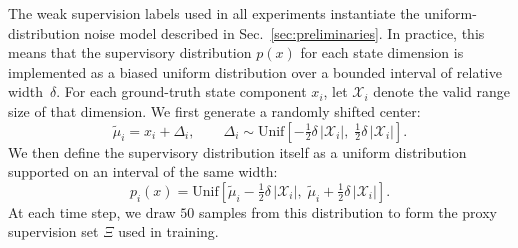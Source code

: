 \documentclass[nonacm,sigconf]{acmart}
\begin{document}
The weak supervision labels used in all experiments instantiate the 
uniform-distribution noise model described in Sec.~\ref{sec:preliminaries}.  
In practice, this means that the supervisory distribution $p(x)$ for
each state dimension is implemented as a biased uniform distribution over a 
bounded interval of relative width~$\delta$.  For each ground-truth 
state component $x_i$, let $\mathcal{X}_i$ denote the valid 
range size of that dimension.  We first generate a randomly shifted 
center:
\[
\tilde{\mu}_i 
= x_i + \Delta_i,
\qquad 
\Delta_i \sim \mathrm{Unif}\!\left[
    -\tfrac{1}{2}\delta \,|\mathcal{X}_i|,\;
    \tfrac{1}{2}\delta \,|\mathcal{X}_i|
\right].
\]
We then define the supervisory distribution itself as a uniform
distribution supported on an interval of the same width:
\[
p_i(x) = \mathrm{Unif}\!\left[
\tilde{\mu}_i - \tfrac{1}{2}\delta\,|\mathcal{X}_i|,\;
\tilde{\mu}_i + \tfrac{1}{2}\delta\,|\mathcal{X}_i|
\right].
\]
At each time step, we draw $50$ samples from this distribution to form 
the proxy supervision set $\Xi$ used in training.





\end{document}

